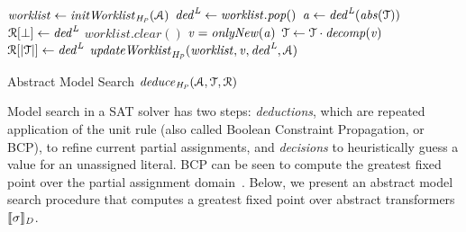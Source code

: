 \begin{algorithm2e}[t]
\DontPrintSemicolon
{}
\begin{small}
$\mathit{worklist} \leftarrow \mathit{initWorklist}_{\mathit{H_P}}(\mathcal{A})$ \;
{
  $\mathit{ded}^{\mathit{L}} \leftarrow \mathit{worklist.pop}()$ \; 
  $\mathit{a} \leftarrow \mathit{ded}^{\mathit{L}}(\mathit{abs}(\mathcal{T}))$\;
  \uIf{$\absval = \bot$} {
    $\mathcal{R}[\bot] \leftarrow \mathit{ded}^{\mathit{L}}$ \;
    $\mathit{worklist.clear}()$ \;
    \return \conflict \;
  }
  \uElse
  {
    $\mathit{v}=\mathit{onlyNew}(\mathit{a})$\;
    $\mathcal{T} \leftarrow \mathcal{T} \cdot {\mathit{decomp}}(\mathit{v})$ \; 
    $\mathcal{R}[|\mathcal{T}|] \leftarrow \mathit{ded}^{\mathit{L}}$ \;
    $\mathit{updateWorklist}_{\mathit{H_P}}(\mathit{worklist}, \mathit{v}, \mathit{ded}^{\mathit{L}},  \mathcal{A})$ \; 
  }
}
 {\return \sat}
 \return \unknown \;

\end{small}
\caption{Abstract Model Search $\mathit{deduce}_{\mathit{H_P}}(\mathcal{A},\mathcal{T},\mathcal{R})$ \label{Alg:ms}}
\end{algorithm2e}

Model search in a SAT solver has two steps: {\em deductions}, which are
repeated application of the unit rule (also called Boolean Constraint
Propagation, or BCP), to refine current partial assignments, and {\em
decisions} to heuristically guess a value for an unassigned literal.  BCP
can be seen to compute the greatest fixed point over the partial assignment
domain~\cite{dhk2013-popl}.  Below, we present an abstract model search
procedure that computes a greatest fixed point over abstract
transformers~$\llbracket \sigma \rrbracket_{\mathit{D}}$.
 
%

